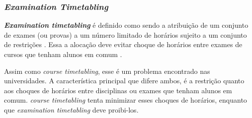 \subsubsection{\textit{Examination Timetabling}}

\textbf{\textit{Examination timetabling}} é definido como sendo a atribuição de um conjunto de exames (ou provas) a um número limitado de horários sujeito a um conjunto de restrições \cite{yang2004novel}. Essa a alocação deve evitar choque de horários entre exames de cursos que tenham alunos em comum \cite{schaerf1999survey}.

Assim como \textit{course timetabling}, esse é um problema encontrado nas universidades. A característica principal que difere ambos, é a restrição quanto aos choques de horários entre disciplinas ou exames que tenham alunos em comum. \textit{course timetabling} tenta minimizar esses choques de horários, enquanto que \textit{examination timetabling} deve proibi-los.